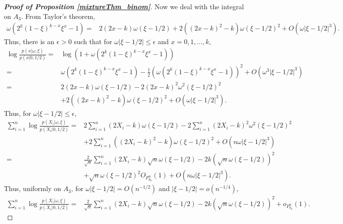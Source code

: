 \documentclass[11pt]{article}
\theoremstyle{plain}
\theoremstyle{definition}
\theoremstyle{remark}
\begin{document}
\begin{appendices}
\begin{proof}[\textbf{Proof of Proposition \ref{mixtureThm_binom}}]
Now we deal with the integral on $A_3$.
From Taylor's theorem,
\begin{align*}
    \omega (2^k{(1-\xi)^{k-x} \xi^x} - 1)
    =&
     2 \left(2x - k \right) \omega ( \xi - 1/2 ) 
    + 2 \left((2x-k)^2 - k \right) \omega ( \xi - 1/2 )^2
    + O( \omega |\xi - 1/2 |^3).
\end{align*}
Thus, there is an $\epsilon > 0$ such that for $\omega |\xi - 1/2 | \leq \epsilon $ and $x = 0, 1, \dots, k$,
\begin{align*}
    \log \frac{p(x|\omega, \xi)}{p(x|0, 1/2 )}
    =&
    \log \left( 1 + 
        \omega (2^k{(1-\xi)^{k-x} \xi^x} - 1)
    \right)
    \\
    =&
        \omega (2^k{(1-\xi)^{k-x} \xi^x} - 1)
        -\frac{1}{2}
        \left(\omega (2^k{(1-\xi)^{k-x} \xi^x} - 1)\right)^2
        +O(\omega^3 | \xi - 1/2 |^3 )
    \\
    =&
     2 \left(2x - k \right) \omega ( \xi - 1/2 ) 
    - 2 \left(2x - k \right)^2 \omega^2 ( \xi - 1/2 )^2
    \\
    &
    + 2 \left((2x-k)^2 - k \right) \omega ( \xi - 1/2 )^2
        +
        O(\omega | \xi - 1/2 |^3 )
        .
\end{align*}
Thus, for $\omega |\xi - 1/2 | \leq \epsilon $,
\begin{align*}
    \sum_{i=1}^n \log \frac{p( X_i |\omega, \xi )}{p( X_i |0, 1/2 )}
    =&
    2 \sum_{i=1}^n \left(2 X_i - k \right) \omega ( \xi - 1/2 ) 
    - 2 \sum_{i=1}^n \left(2 X_i - k \right)^2 \omega^2 ( \xi - 1/2 )^2
    \\
    &
    + 2 \sum_{i=1}^n \left((2 X_i - k)^2 - k \right) \omega ( \xi - 1/2 )^2
        +
        O( n \omega | \xi - 1/2 |^3 )
        \\
    =&
    \frac{2}{\sqrt n}  \sum_{i=1}^n \left(2 X_i - k \right)
     \sqrt n \omega ( \xi - 1/2 ) 
     - 2 k \left( \sqrt n \omega ( \xi - 1/2 )\right)^2
    \\
    &
        +
     \sqrt n \omega ( \xi - 1/2 )^2 O_{P_{\theta_0}^n}(1)
        +
        O( n \omega | \xi - 1/2 |^3 ).
\end{align*}
Thus, uniformly on $A_3$,
for $\omega |\xi - 1/2 | = O(n^{-1/2})$ and $|\xi- 1/2| = o(n^{-1/4})$,
\begin{align}
    \sum_{i=1}^n \log \frac{p( X_i |\omega, \xi )}{p( X_i |0, 1/2 )}
    =&
    \frac{2}{\sqrt n}  \sum_{i=1}^n \left(2 X_i - k \right)
     \sqrt n \omega ( \xi - 1/2 ) 
     - 2 k \left( \sqrt n \omega ( \xi - 1/2 )\right)^2
     +
     o_{P_{\theta_0}^n}(1).
     \label{eq:2020binom}
\end{align}


\end{proof}
\end{appendices}
\end{document}
